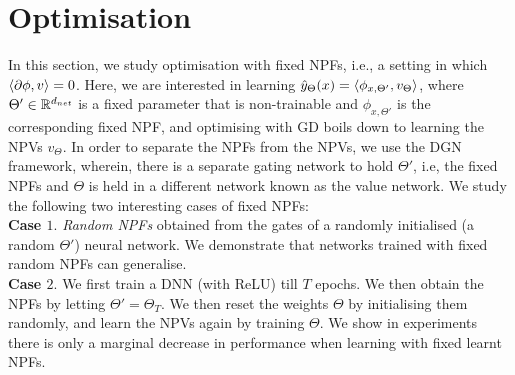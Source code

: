 \section{Optimisation}\label{sec:optimisation}
In this section, we study optimisation with fixed NPFs, i.e., a setting in which $\langle \partial \phi,v\rangle=0$. Here, we are interested in learning $\hat{y}_{\Theta}(x)=\langle \phi_{x,\Theta'}, v_{\Theta}\rangle$, where $\Theta'\in\mathbb{R}^{d_{net}}$ is a fixed parameter that is non-trainable and $\phi_{x,\Theta'}$ is the corresponding fixed NPF, and optimising with GD boils down to learning the NPVs $v_{\Theta}$. In order to separate the NPFs from the NPVs, we use the DGN framework, wherein, there is a separate gating network to hold $\Theta'$, i.e, the fixed NPFs and $\Theta$ is held in a different network known as the value network. We study the following two interesting cases of fixed NPFs:\\
\textbf{Case $1.$} \emph{Random NPFs} obtained from the gates of a randomly initialised (a random $\Theta'$) neural network. We demonstrate that networks trained with fixed random NPFs can generalise.\\
\textbf{Case $2.$} We first train a DNN (with ReLU) till $T$ epochs. We then obtain the NPFs by letting $\Theta'=\Theta_T$. We then reset the weights $\Theta$ by initialising them randomly, and learn the NPVs again by training $\Theta$. We show in experiments there is only a marginal decrease in performance when learning with fixed learnt NPFs.
\FloatBarrier
